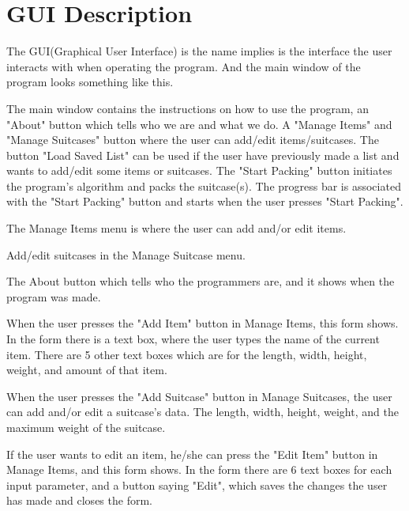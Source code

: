 \section{GUI Description}

The GUI(Graphical User Interface) is the name implies is the interface the user interacts with when operating the program.
And the main window of the program looks something like this.


The main window contains the instructions on how to use the program, an "About" button which tells who we are and what we do. A "Manage Items" and "Manage Suitcases" button where the user can add/edit items/suitcases. The button "Load Saved List" can be used if the user have previously made a list and wants to add/edit some items or suitcases. The "Start Packing" button initiates the program's algorithm and packs the suitcase(s). The progress bar is associated with the "Start Packing" button and starts when the user presses "Start Packing".

The Manage Items menu is where the user can add and/or edit items.

Add/edit suitcases in the Manage Suitcase menu.

The About button which tells who the programmers are, and it shows when the program was made.

When the user presses the "Add Item" button in Manage Items, this form shows. In the form there is a text box, where the user types the name of the current item. There are 5 other text boxes which are for the length, width, height, weight, and amount of that item.

When the user presses the "Add Suitcase" button in Manage Suitcases, the user can add and/or edit a suitcase's data. The length, width, height, weight, and the maximum weight of the suitcase. 

If the user wants to edit an item, he/she can press the "Edit Item" button in Manage Items, and this form shows. In the form there are 6 text boxes for each input parameter, and a button saying "Edit", which saves the changes the user has made and closes the form.

